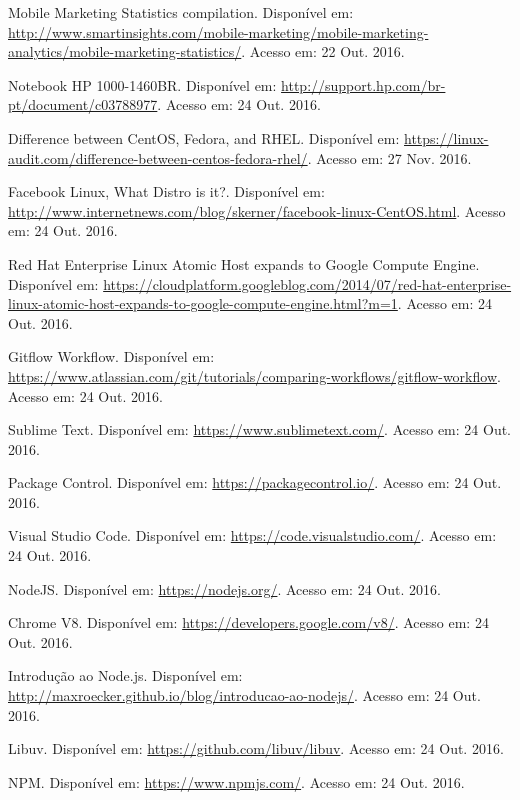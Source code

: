 \documentclass[brazil,ruledheader]{abntifes}
\begin{document}
\begin{thebibliography}{9}
		Mobile Marketing Statistics compilation. Disponível em: \url{http://www.smartinsights.com/mobile-marketing/mobile-marketing-analytics/mobile-marketing-statistics/}.
		Acesso em: 22 Out. 2016.
		
		Notebook HP 1000-1460BR. Disponível em: \url{http://support.hp.com/br-pt/document/c03788977}.
		Acesso em: 24 Out. 2016.
		
		Difference between CentOS, Fedora, and RHEL. Disponível em: \url{https://linux-audit.com/difference-between-centos-fedora-rhel/}.
		Acesso em: 27 Nov. 2016.
		
		Facebook Linux, What Distro is it?. Disponível em: \url{http://www.internetnews.com/blog/skerner/facebook-linux-CentOS.html}.
		Acesso em: 24 Out. 2016.
		
		Red Hat Enterprise Linux Atomic Host expands to Google Compute Engine. Disponível em: \url{https://cloudplatform.googleblog.com/2014/07/red-hat-enterprise-linux-atomic-host-expands-to-google-compute-engine.html?m=1}.
		Acesso em: 24 Out. 2016.
		
		Gitflow Workflow. Disponível em: \url{https://www.atlassian.com/git/tutorials/comparing-workflows/gitflow-workflow}.
		Acesso em: 24 Out. 2016.
		
		Sublime Text. Disponível em: \url{https://www.sublimetext.com/}.
		Acesso em: 24 Out. 2016.
		
		Package Control. Disponível em: \url{https://packagecontrol.io/}.
		Acesso em: 24 Out. 2016.
		
		Visual Studio Code. Disponível em: \url{https://code.visualstudio.com/}.
		Acesso em: 24 Out. 2016.
		
		NodeJS. Disponível em: \url{https://nodejs.org/}.
		Acesso em: 24 Out. 2016.
		
		Chrome V8. Disponível em: \url{https://developers.google.com/v8/}.
		Acesso em: 24 Out. 2016.
		
		Introdução ao Node.js. Disponível em: \url{http://maxroecker.github.io/blog/introducao-ao-nodejs/}.
		Acesso em: 24 Out. 2016.
		
		Libuv. Disponível em: \url{https://github.com/libuv/libuv}.
		Acesso em: 24 Out. 2016.
		
		NPM. Disponível em: \url{https://www.npmjs.com/}.
		Acesso em: 24 Out. 2016.
		

\end{thebibliography}
\end{document}
